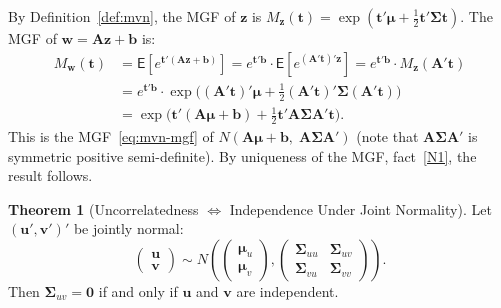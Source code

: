 \documentclass[12pt,a4paper]{article}
\makeatletter
\theoremstyle{definition}
\newtheorem{theorem}{Theorem}[section]
\renewenvironment{proof}[1][\proofname]{\par
  \pushQED{\qed}%
  \normalfont \topsep6\p@\@plus6\p@\relax
  \trivlist
  \item[\hskip\labelsep\bfseries #1\@addpunct{.}]\ignorespaces
}{%
  \popQED\endtrivlist\@endpefalse
}
\newcommand\expc{\mathsf{E}}
\newcommand{\bzero}{\mathbf{0}}
\newcommand{\bz}{\mathbf{z}}
\newcommand{\bw}{\mathbf{w}}
\newcommand{\bA}{\mathbf{A}}
\newcommand{\bv}{\mathbf{v}}
\newcommand{\bu}{\mathbf{u}}
\makeatother
\begin{document}
\begin{proof}
By Definition~\ref{def:mvn}, the MGF of $\bz$ is $M_{\bz}(\mathbf{t}) = \exp(\mathbf{t}'\boldsymbol\mu + \frac{1}{2}\mathbf{t}'\boldsymbol\Sigma\mathbf{t})$. The MGF of $\bw = \bA\bz + \mathbf{b}$ is:
\begin{align*}
M_{\bw}(\mathbf{t}) &= \expc\!\left[e^{\mathbf{t}'(\bA\bz + \mathbf{b})}\right] = e^{\mathbf{t}'\mathbf{b}} \cdot \expc\!\left[e^{(\bA'\mathbf{t})' \bz}\right] = e^{\mathbf{t}'\mathbf{b}} \cdot M_{\bz}(\bA'\mathbf{t})\\
&= e^{\mathbf{t}'\mathbf{b}} \cdot \exp\bigl((\bA'\mathbf{t})'\boldsymbol\mu + \tfrac{1}{2}(\bA'\mathbf{t})'\boldsymbol\Sigma(\bA'\mathbf{t})\bigr)\\
&= \exp\bigl(\mathbf{t}'(\bA\boldsymbol\mu + \mathbf{b}) + \tfrac{1}{2}\mathbf{t}'\bA\boldsymbol\Sigma\bA'\mathbf{t}\bigr).
\end{align*}
This is the MGF~\eqref{eq:mvn-mgf} of $N(\bA\boldsymbol\mu + \mathbf{b},\; \bA\boldsymbol\Sigma\bA')$ (note that $\bA\boldsymbol\Sigma\bA'$ is symmetric positive semi-definite). By uniqueness of the MGF, fact~\ref{N1}, the result follows.
\end{proof}

\begin{theorem}[Uncorrelatedness $\Leftrightarrow$ Independence Under Joint Normality]\label{thm:mvn-uncorr-indep}
Let $(\bu', \bv')'$ be jointly normal:
\[
\begin{pmatrix} \bu \\ \bv \end{pmatrix} \sim N\!\left(\begin{pmatrix} \boldsymbol\mu_u \\ \boldsymbol\mu_v \end{pmatrix}, \begin{pmatrix} \boldsymbol\Sigma_{uu} & \boldsymbol\Sigma_{uv} \\ \boldsymbol\Sigma_{vu} & \boldsymbol\Sigma_{vv} \end{pmatrix}\right).
\]
Then $\boldsymbol\Sigma_{uv} = \bzero$ if and only if $\bu$ and $\bv$ are independent.
\end{theorem}
\end{document}

